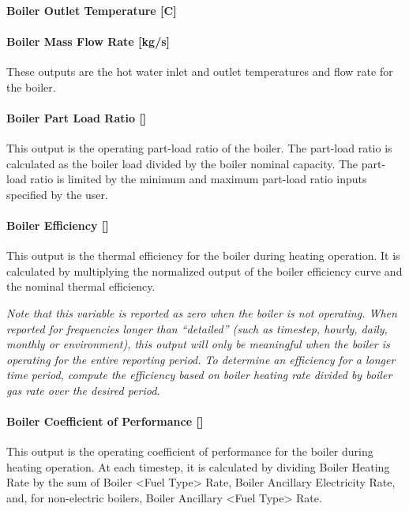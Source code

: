 \paragraph{Boiler Outlet Temperature {[}C{]}}\label{boiler-outlet-temperature-c}

\paragraph{Boiler Mass Flow Rate {[}kg/s{]}}\label{boiler-mass-flow-rate-kgs}

These outputs are the hot water inlet and outlet temperatures and flow rate for the boiler.

\paragraph{Boiler Part Load Ratio {[]}}\label{boiler-part-load-ratio}

This output is the operating part-load ratio of the boiler. The part-load ratio is calculated as the boiler load divided by the boiler nominal capacity. The part-load ratio is limited by the minimum and maximum part-load ratio inputs specified by the user.

\paragraph{Boiler Efficiency {[]}}\label{boiler-efficiency}

This output is the thermal efficiency for the boiler during heating operation. It is calculated by multiplying the normalized output of the boiler efficiency curve and the nominal thermal efficiency.

\emph{Note that this variable is reported as zero when the boiler is not operating. When reported for frequencies longer than ``detailed'' (such as timestep, hourly, daily, monthly or environment), this output will only be meaningful when the boiler is operating for the entire reporting period. To determine an efficiency for a longer time period, compute the efficiency based on boiler heating rate divided by boiler gas rate over the desired period.}

\paragraph{Boiler Coefficient of Performance {[]}}\label{boiler-coefficient-of-performance}

This output is the operating coefficient of performance for the boiler during heating operation. At each timestep, it is calculated by dividing Boiler Heating Rate by the sum of Boiler \textless{}Fuel Type\textgreater{} Rate, Boiler Ancillary Electricity Rate, and, for non-electric boilers, Boiler Ancillary \textless{}Fuel Type\textgreater{} Rate.

